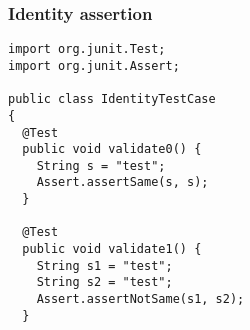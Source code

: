 \begin{frame}[fragile, hasprev=false, hasnext=false]
\frametitle{Identity assertion}
\label{example:junit-identity-assertion}

\begin{lstlisting}
import org.junit.Test;
import org.junit.Assert;

public class IdentityTestCase
{
  @Test
  public void validate0() {
    String s = "test";
    Assert.assertSame(s, s);
  }

  @Test
  public void validate1() {
    String s1 = "test";
    String s2 = "test";
    Assert.assertNotSame(s1, s2);
  }
\end{lstlisting}
\end{frame}